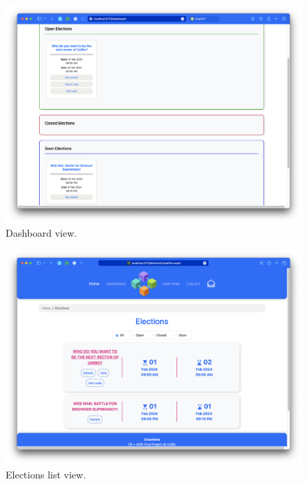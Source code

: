 \documentclass{scrartcl}
\begin{document}
\begin{figure}
    \centering
    \includegraphics[width=0.9\linewidth]{figures/story-board/6-dashboard.png}
    \caption{Dashboard view.}
    \label{fig:dashboard}
\end{figure}

\begin{figure}
    \centering
    \includegraphics[width=0.9\linewidth]{figures/story-board/6a-elections.png}
    \caption{Elections list view.}
    \label{fig:elections}
\end{figure}
\end{document}
